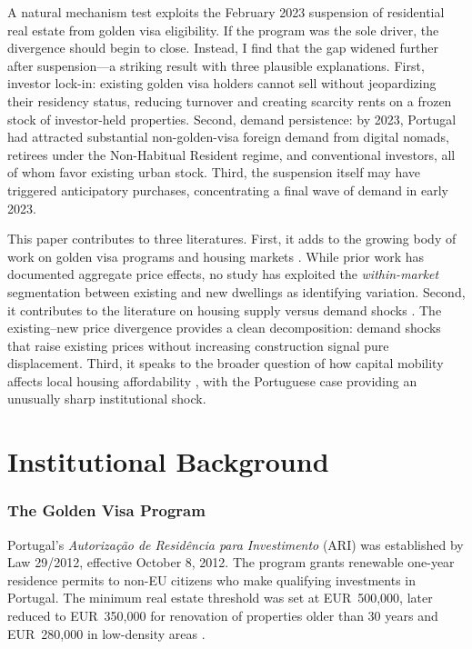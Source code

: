 \documentclass[12pt]{article}
\begin{document}
A natural mechanism test exploits the February 2023 suspension of residential real estate from golden visa eligibility. If the program was the sole driver, the divergence should begin to close. Instead, I find that the gap widened further after suspension---a striking result with three plausible explanations. First, investor lock-in: existing golden visa holders cannot sell without jeopardizing their residency status, reducing turnover and creating scarcity rents on a frozen stock of investor-held properties. Second, demand persistence: by 2023, Portugal had attracted substantial non-golden-visa foreign demand from digital nomads, retirees under the Non-Habitual Resident regime, and conventional investors, all of whom favor existing urban stock. Third, the suspension itself may have triggered anticipatory purchases, concentrating a final wave of demand in early 2023.

This paper contributes to three literatures. First, it adds to the growing body of work on golden visa programs and housing markets \citep{BadarinzaRamadorai2018, SaFurtado2021, Dimmock2023}. While prior work has documented aggregate price effects, no study has exploited the \textit{within-market} segmentation between existing and new dwellings as identifying variation. Second, it contributes to the literature on housing supply versus demand shocks \citep{Glaeser2018, MianSufi2022}. The existing--new price divergence provides a clean decomposition: demand shocks that raise existing prices without increasing construction signal pure displacement. Third, it speaks to the broader question of how capital mobility affects local housing affordability \citep{FavillaraSoledad2020, Sa2016}, with the Portuguese case providing an unusually sharp institutional shock.

\section{Institutional Background}

\subsubsection*{The Golden Visa Program} Portugal's \textit{Autoriza\c{c}\~{a}o de Resid\^{e}ncia para Investimento} (ARI) was established by Law 29/2012, effective October 8, 2012. The program grants renewable one-year residence permits to non-EU citizens who make qualifying investments in Portugal. The minimum real estate threshold was set at EUR~500,000, later reduced to EUR~350,000 for renovation of properties older than 30 years and EUR~280,000 in low-density areas \citep{SEFRegulation}.
\end{document}
